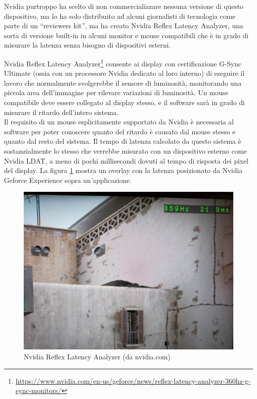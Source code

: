 Nvidia purtroppo ha scelto di non commercializzare nessuna versione di questo dispositivo, ma lo ha solo distribuito ad alcuni giornalisti di tecnologia come parte di un ``reviewers kit'', ma ha creato Nvidia Reflex Latency Analyzer, una sorta di versione built-in in alcuni monitor e mouse compatibili che è in grado di misurare la latenza senza bisogno di dispositivi esterni.

Nvidia Reflex Latency Analyzer\footnote{\href{https://www.nvidia.com/en-us/geforce/news/reflex-latency-analyzer-360hz-g-sync-monitors/}{https://www.nvidia.com/en-us/geforce/news/reflex-latency-analyzer-360hz-g-sync-monitors/}} consente ai display con certificazione G-Sync Ultimate (ossia con un processore Nvidia dedicato al loro interno) di eseguire il lavoro che normalmente svolgerebbe il sensore di luminosità, monitorando una piccola area dell'immagine per rilevare variazioni di luminosità. Un mouse compatibile deve essere collegato al display stesso, e il software sarà in grado di misurare il ritardo dell'intero sistema.\\
Il requisito di un mouse esplicitamente supportato da Nvidia è necessaria al software per poter conoscere quanto del ritardo è causato dal mouse stesso e quanto dal resto del sistema. Il tempo di latenza calcolato da questo sistema è sostanzialmente lo stesso che verrebbe misurato con un dispositivo esterno come Nvidia LDAT, a meno di pochi millisecondi dovuti al tempo di risposta dei pixel del display. La figura \ref{fig:nvreflex_example} mostra un overlay con la latenza posizionato da Nvidia Geforce Experience sopra un'applicazione.

\begin{figure}[h!]
	\centering
	\includegraphics[width=\textwidth]{StatoDellArte_files/nvreflex_example.jpg}
	\caption{Nvidia Reflex Latency Analyzer (da nvidia.com)}
	\label{fig:nvreflex_example}
\end{figure}

